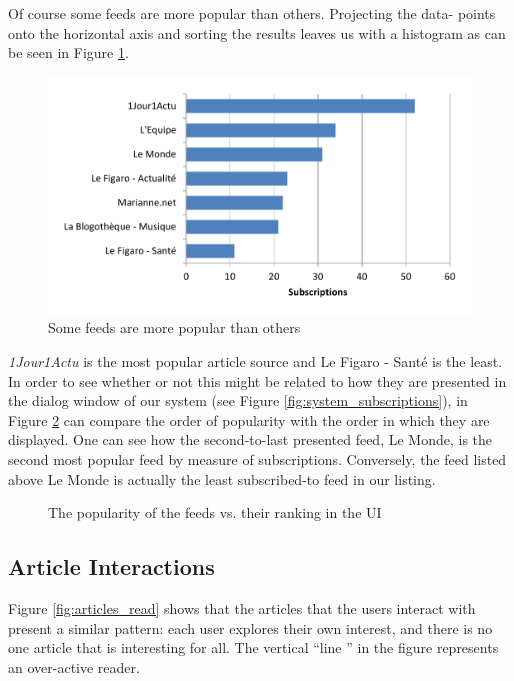 Of course some feeds are more popular than others. Projecting the data- points onto the horizontal axis and sorting the results leaves us with a histogram as can be seen in Figure \ref{fig:feedpopularity}.

\begin{figure}[h!]
\centering
  \includegraphics[width=\columnwidth]{figures/feed_popularity}
  \caption{Some feeds are more popular than others}
  \label{fig:feedpopularity}
\end{figure}


{\em 1Jour1Actu} is the most popular article source and Le Figaro - Sant\'e is the least. In order to see whether or not this might be related to how they are presented in the dialog window of our system (see Figure \ref{fig:system_subscriptions}), in Figure \ref{fig:popularityvsranking} can compare the order of popularity with the order in which they are displayed. One can see how the second-to-last presented feed, Le Monde, is the second most popular feed by measure of subscriptions. Conversely, the feed listed above Le Monde is actually the least subscribed-to feed in our listing.


\begin{figure}[h!]
\centering
  
  \caption{The popularity of the feeds vs. their ranking in the UI}
  \label{fig:popularityvsranking}
\end{figure}




\subsection{Article Interactions}
Figure \ref{fig:articles_read} shows that the articles that the users interact with present a similar pattern: each user explores their own interest, and there is no one article that is interesting for all. The vertical ``line '' in the figure represents an over-active reader.

